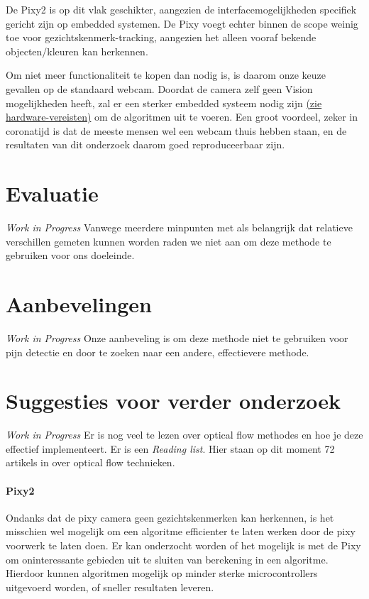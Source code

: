 \documentclass[11pt]{article}
\begin{document}

    De Pixy2 is op dit vlak geschikter, aangezien de interfacemogelijkheden specifiek gericht zijn op embedded systemen.
    De Pixy voegt echter binnen de scope weinig toe voor gezichtskenmerk-tracking, aangezien het alleen vooraf bekende objecten/kleuren kan herkennen.

    Om niet meer functionaliteit te kopen dan nodig is, is daarom onze keuze gevallen op de standaard webcam.
    Doordat de camera zelf geen Vision mogelijkheden heeft, zal er een sterker embedded systeem nodig zijn \hyperref[meth1-hardware]{(zie hardware-vereisten)} om de algoritmen uit te voeren.
    Een groot voordeel, zeker in coronatijd is dat de meeste mensen wel een webcam thuis hebben staan, en de resultaten van dit onderzoek daarom goed reproduceerbaar zijn.


    \section{Evaluatie}\label{sec:evaluatie2}
    \emph{Work in Progress}
    Vanwege meerdere minpunten met als belangrijk dat relatieve verschillen gemeten kunnen worden raden we niet aan om deze methode te gebruiken voor ons doeleinde.


    \section{Aanbevelingen}\label{sec:aanbevelingen2}
    \emph{Work in Progress}
    Onze aanbeveling is om deze methode niet te gebruiken voor pijn detectie en door te zoeken naar een andere, effectievere methode.



    \section{Suggesties voor verder onderzoek}\label{sec:suggesties-voor-verder-onderzoek2}
    \emph{Work in Progress}
    Er is nog veel te lezen over optical flow methodes en hoe je deze effectief implementeert.
    Er is een \emph{\citet{Readinglist} Reading list}.
    Hier staan op dit moment 72 artikels in over optical flow technieken.

    \paragraph{Pixy2}
    Ondanks dat de pixy camera geen gezichtskenmerken kan herkennen, is het misschien wel mogelijk om een algoritme efficienter te laten werken door de pixy voorwerk te laten doen.
    Er kan onderzocht worden of het mogelijk is met de Pixy om oninteressante gebieden uit te sluiten van berekening in een algoritme.
    Hierdoor kunnen algoritmen mogelijk op minder sterke microcontrollers uitgevoerd worden, of sneller resultaten leveren.
\end{document}
